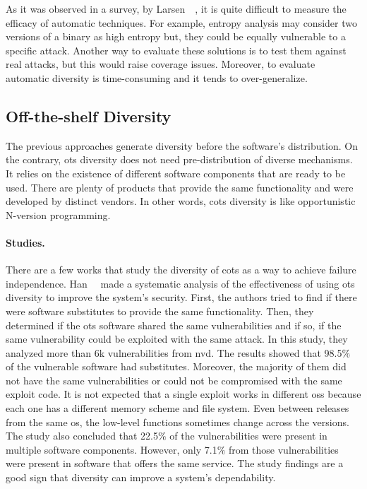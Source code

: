As it was observed in a survey, by Larsen~\etal{}~\cite{Larsen:2015}, it is quite difficult to measure the efficacy of automatic techniques.
For example, entropy analysis may consider two versions of a binary as high entropy but, they could be equally vulnerable to a specific attack.
Another way to evaluate these solutions is to test them against real attacks, but this would raise coverage issues.
Moreover, to evaluate automatic diversity is time-consuming and it tends to over-generalize.


\subsection{Off-the-shelf Diversity}
The previous approaches generate diversity before the software’s distribution. 
On the contrary, \gls{ots} diversity does not need pre-distribution of diverse mechanisms. 
It relies on the existence of different software components that are ready to be used.
There are plenty of products that provide the same functionality and were developed by distinct vendors. 
In other words, \gls{cots} diversity is like opportunistic N-version programming.


\paragraph{Studies.}
There are a few works that study the diversity of \gls{cots} as a way to achieve failure independence.
Han~\etal{}~\cite{Han:2009} made a systematic analysis of the effectiveness of using \gls{ots} diversity to improve the system's security.
First, the authors tried to find if there were software substitutes to provide the same functionality. 
Then, they determined if the \gls{ots} software shared the same vulnerabilities and if so, if the same vulnerability could be exploited with the same attack. 
In this study, they analyzed more than 6k vulnerabilities from \gls{nvd}. 
The results showed that 98.5$\%$ of the vulnerable software had substitutes. 
Moreover, the majority of them did not have the same vulnerabilities or could not be compromised with the same exploit code. 
It is not expected that a single exploit works in different \glspl{os} because each one has a different memory scheme and file system. 
Even between releases from the same \gls{os}, the low-level functions sometimes change across the versions. 
The study also concluded that 22.5$\%$ of the vulnerabilities were present in multiple software components. 
However, only 7.1$\%$ from those vulnerabilities were present in software that offers the same service. 
The study findings are a good sign that diversity can improve a system’s dependability.


